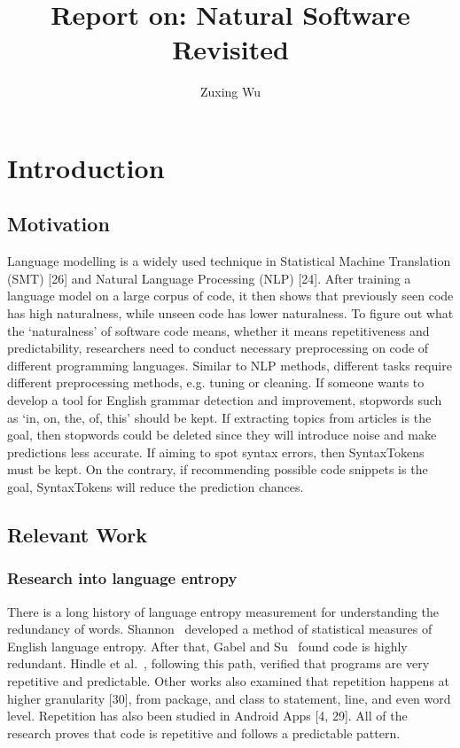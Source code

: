 \documentclass[runningheads]{llncs}
\begin{document}
%
\title{Report on: Natural Software Revisited}
%
%
\author{Zuxing Wu}
%
%
%
\maketitle              %
%
%
\section{Introduction}
\subsection{Motivation}
Language modelling is a widely used technique in Statistical Machine Translation (SMT) [26] and Natural Language Processing (NLP) [24]. After training a language model on a large corpus of code, it then shows that previously seen code has high naturalness, while unseen code has lower naturalness. To figure out what the ‘naturalness’ of software code means, whether it means repetitiveness and predictability, researchers need to conduct necessary preprocessing on code of different programming languages. Similar to NLP methods, different tasks require different preprocessing methods, e.g. tuning or cleaning. If someone wants to develop a tool for English grammar detection and improvement, stopwords such as ‘in, on, the, of, this’ should be kept. If extracting topics from articles is the goal, then stopwords could be deleted since they will introduce noise and make predictions less accurate. If aiming to spot syntax errors, then SyntaxTokens must be kept. On the contrary, if recommending possible code snippets is the goal, SyntaxTokens will reduce the prediction chances.

\subsection{Relevant Work}
\subsubsection{Research into language entropy\\}
There is a long history of language entropy measurement for understanding the redundancy of words. Shannon~\cite{ref_shannon1951} developed a method of statistical measures of English language entropy. After that, Gabel and Su~\cite{ref_chen2001} found code is highly redundant. Hindle et al.~\cite{ref_hindle2012}, following this path, verified that programs are very repetitive and predictable. Other works also examined that repetition happens at higher granularity [30], from package, and class to statement, line, and even word level. Repetition has also been studied in Android Apps [4, 29]. All of the research proves that code is repetitive and follows a predictable pattern.
\end{document}
